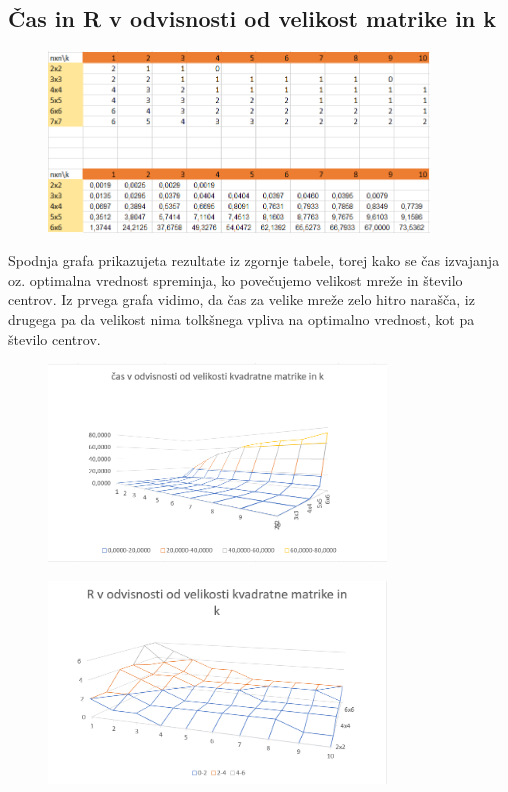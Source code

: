 \documentclass[a4paper]{article}
\begin{document}
\subsection{Čas in R v odvisnosti od velikost matrike in k}
\begin{figure}[h]
  \centering
  \includegraphics[width= 0.9\textwidth]{tabela_kvadratne}
\end{figure}

Spodnja grafa prikazujeta rezultate iz zgornje tabele, torej kako se čas izvajanja oz. optimalna vrednost spreminja, ko povečujemo velikost mreže in število centrov. Iz prvega grafa vidimo, da čas za velike mreže zelo hitro narašča, iz drugega pa da velikost nima tolkšnega vpliva na optimalno vrednost, kot pa število centrov.
\begin{figure}[h]
  \centering
  \includegraphics[width= 0.8\textwidth]{cas_3D}
\end{figure}

\newpage

\begin{figure}[h]
  \centering
  \includegraphics[width= 0.8\textwidth]{R_3D}
\end{figure}
\end{document}
